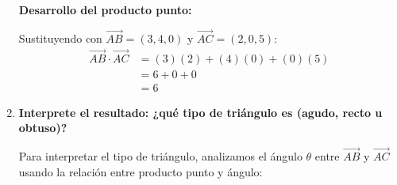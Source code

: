 \documentclass{article}
\begin{document}
\begin{enumerate}[label=\textbf{\arabic*.}, itemsep=1em, leftmargin=2em]
    \begin{center}
    \colorbox{red!5}{\begin{minipage}{0.9\textwidth}
    \vspace{0.3cm}
    \textbf{Desarrollo del producto punto:}
    
    
    \vspace{0.4cm}
    Sustituyendo con $\vec{AB}=(3,4,0)$ y $\vec{AC}=(2,0,5)$:
    \begin{align*}
        \vec{AB}\cdot\vec{AC} &= (3)(2) + (4)(0) + (0)(5) \\
        &= 6 + 0 + 0 \\
        &= \boxed{6}
    \end{align*}
    \vspace{0.2cm}
    
    \begin{center}
    \end{center}
    \vspace{0.2cm}
    \end{minipage}}
    \end{center}

    \item \textcolor{vectorcolor}{\textbf{Interprete el resultado: ¿qué tipo de triángulo es (agudo, recto u obtuso)?}}
    
    \begin{center}
    \colorbox{yellow!5}{\begin{minipage}{0.9\textwidth}
    \vspace{0.3cm}
    Para interpretar el tipo de triángulo, analizamos el ángulo $\theta$ entre $\vec{AB}$ y $\vec{AC}$ usando la relación entre producto punto y ángulo:
    

\end{minipage}}
\end{center}
\end{enumerate}
\end{document}
